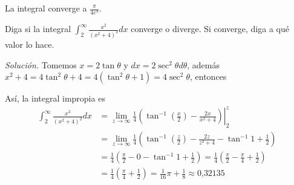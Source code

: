 La integral converge a $\frac{\pi }{4e^{3}}.$

\begin{ejemplo}
\textnormal{Diga si la integral {\small \textit{$\displaystyle\int_{2}^{\infty }\frac{x^{2}}{\left( x^{2}+4\right) ^{2}}dx$}} converge o diverge. Si converge, diga a qué valor lo hace.}
\end{ejemplo}


\textit{Solución.} Tomemos $x=2\tan \theta$ y $dx=2\sec ^{2}\theta d\theta$, además $x^{2}+4=4\tan^{2}\theta +4=4\left( \tan ^{2}\theta +1\right) =4\sec ^{2}\theta $, entonces






Así, la integral impropia es
{\small
\begin{align*}
\int_{2}^{\infty }\frac{x^{2}}{\left( x^{2}+4\right) ^{2}}dx&=\lim_{z\rightarrow \infty }\left.\frac{1}{4}\left( \tan^{-1} \left( \frac{x}{2}\right) -\frac{2x}{x^{2}+4}\right)\right\vert_{2}^{z}\\
&=\lim_{z\rightarrow \infty }\frac{1}{4}\left( \tan^{-1} \left( \frac{z}{2}%
\right) -\frac{2z}{z^{2}+4}-\tan^{-1} 1+\frac{1}{2}\right)\\
&=\frac{1}{4}\left(\frac{\pi }{2}-0-\tan^{-1} 1+\frac{1}{2}\right) =\frac{1}{4}\left( \frac{\pi }{2}-\frac{\pi }{4}+\frac{1}{2}\right)\\ &=\frac{1}{4}\left( \frac{\pi }{4}+\frac{1}{2}\right)=\frac{1}{16}\pi +\frac{1}{8}\approx0\text{,}32135
\end{align*}
}

